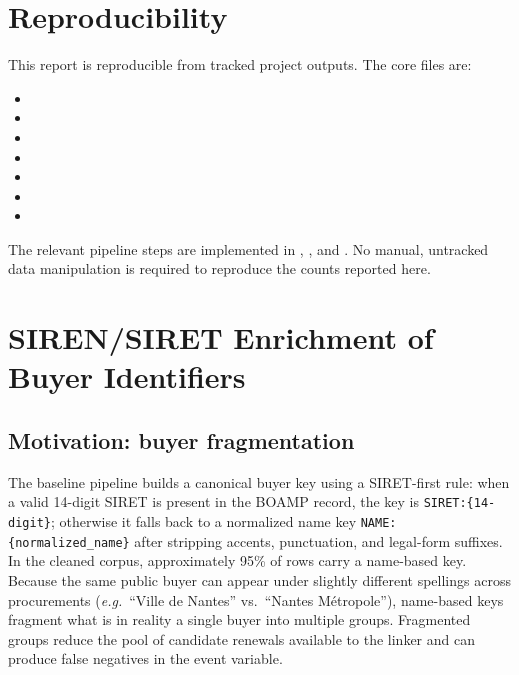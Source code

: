 \documentclass[11pt,a4paper]{article}
\begin{document}
\section{Reproducibility}

This report is reproducible from tracked project outputs. The core files are:

\begin{itemize}
	\item {}
	\item {}
	\item {}
	\item {}
	\item {}
	\item {}
	\item {}
\end{itemize}

The relevant pipeline steps are implemented in ,
, and
. No manual, untracked data
manipulation is required to reproduce the counts reported here.

\section{SIREN/SIRET Enrichment of Buyer Identifiers}
\label{sec:siren-enrichment}

\subsection{Motivation: buyer fragmentation}

The baseline pipeline builds a canonical buyer key using a SIRET-first rule:
when a valid 14-digit SIRET is present in the BOAMP record, the key is
\texttt{SIRET:\{14-digit\}}; otherwise it falls back to a normalized name key
\texttt{NAME:\{normalized\_name\}} after stripping accents, punctuation, and
legal-form suffixes. In the cleaned corpus, approximately 95\% of rows carry a
name-based key. Because the same public buyer can appear under slightly different
spellings across procurements (\emph{e.g.}\ ``Ville de Nantes'' vs.\ ``Nantes
Métropole''), name-based keys fragment what is in reality a single buyer into
multiple groups. Fragmented groups reduce the pool of candidate renewals
available to the linker and can produce false negatives in the event variable.
\end{document}
